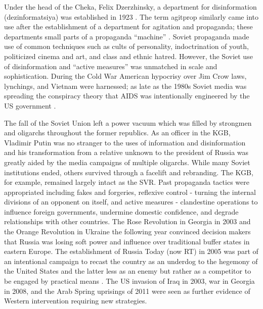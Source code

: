 Under the head of the Cheka, Felix Dzerzhinsky, a department for disinformation (dezinformatsiya) was established in 1923 \cite[p. 18]{rid2020}.
The term agitprop similarly came into use after the establishment of a department for agitation and propaganda; these departments small parts of a propaganda ``machine'' \cite{kenez1985}.
Soviet propaganda made use of common techniques such as cults of personality, indoctrination of youth, politicized cinema and art, and class and ethnic hatred.
However, the Soviet use of disinformation and ``active measures'' was unmatched in scale and sophistication.
During the Cold War American hypocrisy over Jim Crow laws, lynchings, and Vietnam were harnessed; as late as the 1980s Soviet media was spreading the conspiracy theory that AIDS was intentionally engineered by the US government \cite[ch. 11, 22]{rid2020}.

The fall of the Soviet Union left a power vacuum which was filled by strongmen and oligarchs throughout the former republics.
As an officer in the KGB, Vladimir Putin was no stranger to the uses of information and disinformation and his transformation from a relative unknown to the president of Russia was greatly aided by the media campaigns of multiple oligarchs.
While many Soviet institutions ended, others survived through a facelift and rebranding.
The KGB, for example, remained largely intact as the SVR. 
Past propaganda tactics were appropriated including fakes and forgeries, reflexive control - turning the internal divisions of an opponent on itself, and active measures - clandestine operations to influence foreign governments, undermine domestic confidence, and degrade relationships with other countries.
The Rose Revolution in Georgia in 2003 and the Orange Revolution in Ukraine the following year convinced decision makers that Russia was losing soft power and influence over traditional buffer states in eastern Europe.
The establishment of Russia Today (now RT) in 2005 was part of an intentional campaign to recast the country as an underdog to the hegemony of the United States and the latter less as an enemy but rather as a competitor to be engaged by practical means \cite[pp. 21-24]{woolley2018}.
The US invasion of Iraq in 2003, war in Georgia in 2008, and the Arab Spring uprisings of 2011 were seen as further evidence of Western intervention requiring new strategies.

